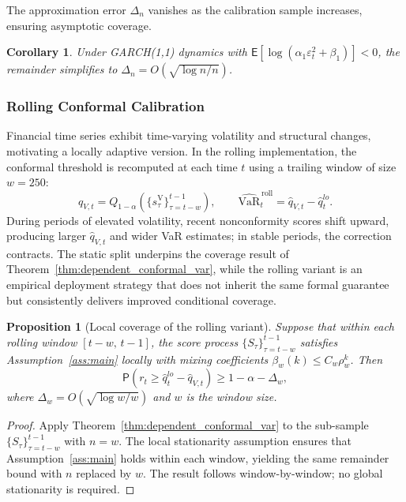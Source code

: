 \documentclass[preprint,11pt,authoryear]{elsarticle}
\newtheorem{corollary}[theorem]{Corollary}
\newtheorem{proposition}[theorem]{Proposition}
\newcommand{\VaR}{\mathrm{VaR}}
\newcommand{\E}{\mathsf{E}}
\renewcommand{\P}{\mathsf{P}}
\newcommand{\1}{\boldsymbol{1}}
\begin{document}
	The approximation error $\Delta_n$ vanishes as the
	calibration sample increases, ensuring asymptotic coverage.
	
	\begin{corollary}
		\label{cor:garch_conformal_var}
		Under GARCH(1,1) dynamics with
		$\E[\log(\alpha_1\varepsilon_t^2 + \beta_1)] < 0$, the
		remainder simplifies to
		$\Delta_n = O(\sqrt{\log n / n})$.
	\end{corollary}
	
	\subsubsection{Rolling Conformal Calibration}
	\label{sec:rolling_method}
	
	Financial time series exhibit time-varying volatility and
	structural changes, motivating a locally adaptive version. In
	the rolling implementation, the conformal threshold is
	recomputed at each time $t$ using a trailing window of size
	$w = 250$:
	\begin{equation}
		\hat{q}_{V,t} = Q_{1-\alpha}\!\left(
		\{s_\tau^{\mathrm{V}}\}_{\tau=t-w}^{t-1}\right),
		\qquad
		\widehat{\VaR}_t^{\,\mathrm{roll}}
		= \hat{q}_{V,t} - \hat{q}_t^{lo}.
		\label{eq:rolling_qv}
	\end{equation}
	During periods of elevated volatility, recent nonconformity
	scores shift upward, producing larger $\hat{q}_{V,t}$ and
	wider VaR estimates; in stable periods, the correction
	contracts. The static split underpins the coverage result of
	Theorem~\ref{thm:dependent_conformal_var}, while the rolling
	variant is an empirical deployment strategy that does not
	inherit the same formal guarantee but consistently delivers
	improved conditional coverage.

	\begin{proposition}[Local coverage of the rolling variant]
		\label{prop:rolling_coverage}
		Suppose that within each rolling window $[t-w,\, t-1]$, the
		score process $\{S_\tau\}_{\tau=t-w}^{t-1}$ satisfies
		Assumption~\ref{ass:main} locally with mixing coefficients
		$\beta_w(k) \leq C_w \rho_w^k$. Then
		\[
		\P\!\left(r_t \geq \hat{q}_t^{lo} - \hat{q}_{V,t}\right)
		\geq 1 - \alpha - \Delta_w,
		\]
		where $\Delta_w = O(\sqrt{\log w / w})$ and $w$ is the window
		size.
	\end{proposition}

	\begin{proof}
		Apply Theorem~\ref{thm:dependent_conformal_var} to the
		sub-sample $\{S_\tau\}_{\tau=t-w}^{t-1}$ with $n = w$. The
		local stationarity assumption ensures that
		Assumption~\ref{ass:main} holds within each window, yielding
		the same remainder bound with $n$ replaced by $w$. The result
		follows window-by-window; no global stationarity is required.
	\end{proof}
\end{document}

